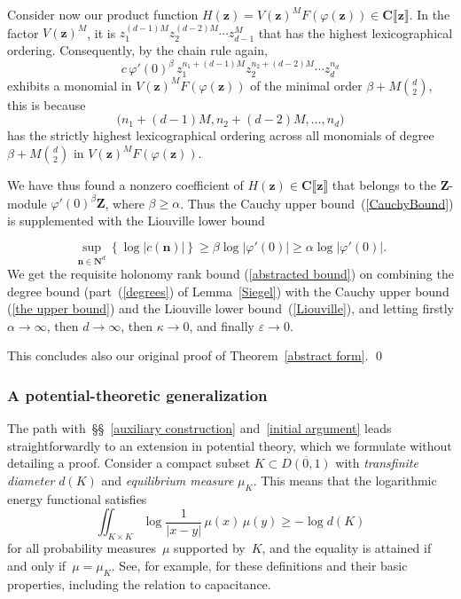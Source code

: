 \documentclass[10pt]{amsart}
\def\NwithzeroB{\mathbf{N}}
\def\SSSSs{\S\S}
\def\Z{\mathbf{Z}}
\theoremstyle{remark}
\numberwithin{equation}{subsection}
\def\numequation{\addtocounter{subsubsection}{1}\begin{equation}}
\def\C{\mathbf{C}}
\begin{document}
Consider now our product function $H(\mathbf{z}) = V(\mathbf{z})^M F(\varphi(\mathbf{z})) \in \C\llbracket \mathbf{z} \rrbracket$. 
 In the factor $V(\mathbf{z})^M$, it is $z_1^{(d-1)M} z_2^{(d-2)M} \cdots z_{d-1}^M$ that has the highest lexicographical ordering. Consequently, by the chain rule again, 
$$
c  \, \varphi'(0)^{\beta} \, z_1^{n_1+(d-1)M} z_2^{n_2+(d-2)M} \cdots z_d^{n_d}
$$
 exhibits a monomial in $V(\mathbf{z})^M F(\varphi(\mathbf{z}))$ of the minimal order $\beta + M \binom{d}{2}$,
 this is because
$$\big(n_1 + (d-1) M, n_2 + (d-2)M, \ldots, n_d\big)$$
 has the strictly highest lexicographical ordering across all monomials of degree $\beta + M \binom{d}{2}$ in $V(\mathbf{z})^M F(\varphi(\mathbf{z}))$.  
 


We have thus found a nonzero coefficient of $H(\mathbf{z}) \in \C\llbracket \mathbf{z} \rrbracket$ that belongs to the $\Z$-module $\varphi'(0)^{\beta} \Z$, where $\beta \geq \alpha$. Thus the Cauchy upper bound~(\ref{CauchyBound}) is supplemented with the Liouville lower bound
\numequation \label{Liouville}
\sup_{\mathbf{n} \in \NwithzeroB^d} \left\{ \log{|c(\mathbf{n})|} \right\} \geq \beta \log{|\varphi'(0)|}  \geq \alpha \log{|\varphi'(0)|}.
\end{equation}
We get the requisite holonomy rank bound (\ref{abstracted bound}) on combining the degree bound
(part~(\ref{degrees}) of Lemma~\ref{Siegel}) with the Cauchy upper bound
(\ref{the upper bound}) and the Liouville lower bound~(\ref{Liouville}), and letting firstly $\alpha \to \infty$, then $d \to \infty$, then $\kappa \to 0$, and finally $\varepsilon \to 0$. 

\medskip

This concludes also our original proof of Theorem~\ref{abstract form}. \qed

\subsubsection{A potential-theoretic generalization} \label{potential sketch} The path with~\SSSSs~\ref{auxiliary construction} and~\ref{initial argument} leads straightforwardly to an extension in potential theory, which we formulate without detailing a proof. Consider a compact subset $K \subset \overline{D(0,1)}$ with \emph{transfinite diameter} $d(K)$ and \emph{equilibrium measure} $\mu_K$. 
This means that the logarithmic energy functional satisfies
$$
\iint_{K \times K} \log{\frac{1}{|x-y|}} \, \mu(x) \, \mu(y) \geq -\log{d(K)}
$$
for all probability measures~$\mu$ supported by~$K$, and the equality is attained if and only if~$\mu = \mu_K$. See, for example, \cite{Kirsch} for these definitions and their basic properties, including the relation to capacitance. 
\end{document}
